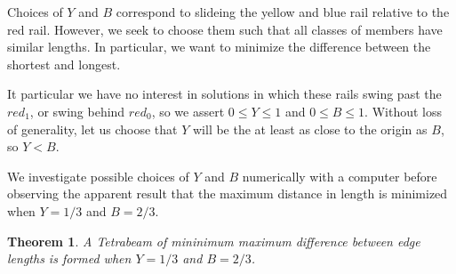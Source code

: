 \documentclass[11pt]{article}
\newtheorem{theorem}{Theorem}
\begin{document}
 Choices of $Y$ and $B$ correspond to slideing the yellow and blue rail relative to the red rail. However, we seek to choose them such that all
 classes of members have similar lengths. In particular, we want to minimize the difference between the shortest and longest.

 It particular we have no interest in solutions in which these rails swing past the $red_1$, or swing behind $red_0$, so we
 assert $0 \leq Y \leq 1$ and $0 \leq B \leq 1$. Without loss of generality, let us choose that $Y$ will be the at least as close to the origin as $B$,
 so $Y  < B$.

 We investigate possible choices of $Y$ and $B$ numerically with a computer before observing the apparent result that the maximum distance in
 length is minimized when $Y = 1/3$ and $B = 2/3$.

 \begin{theorem}
A Tetrabeam of mininimum maximum difference between edge lengths is formed when $Y = 1/3$ and $B = 2/3$.
\end{theorem}
\end{document}
